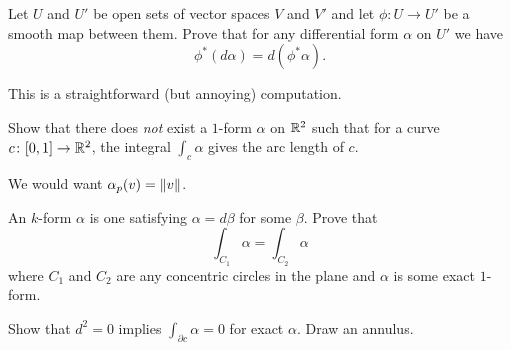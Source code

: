 \begin{problem}
	Let $U$ and $U'$ be open sets of vector spaces $V$ and $V'$
	and let $\phi \colon U \to U'$ be a smooth map between them.
	Prove that for any differential form $\alpha$ on $U'$ we have
	\[ \phi^\ast(d\alpha) = d(\phi^\ast\alpha). \]
	\begin{hint}
		This is a straightforward (but annoying) computation.
	\end{hint}
\end{problem}

\begin{problem}
	\label{prob:ds_not_a_form}
	Show that there does \emph{not} exist a $1$-form $\alpha$ on $\mathbb R^2$ such that
	for a curve $c \colon [0,1] \to \mathbb R^2$,
	the integral $\int_c \alpha$ gives the arc length of $c$.
	\begin{hint}
		We would want $\alpha_p(v) = \left\lVert v \right\rVert$.
	\end{hint}
\end{problem}

\begin{problem}
	An  $k$-form $\alpha$ is one satisfying $\alpha = d\beta$ for some $\beta$.
	Prove that
	\[ \int_{C_1} \alpha = \int_{C_2} \alpha \]
	where $C_1$ and $C_2$ are any concentric circles in the plane
	and $\alpha$ is some exact $1$-form.
	\begin{hint}
		Show that $d^2=0$ implies $\int_{\partial c} \alpha = 0$ for exact $\alpha$.
		Draw an annulus.
	\end{hint}
\end{problem}

